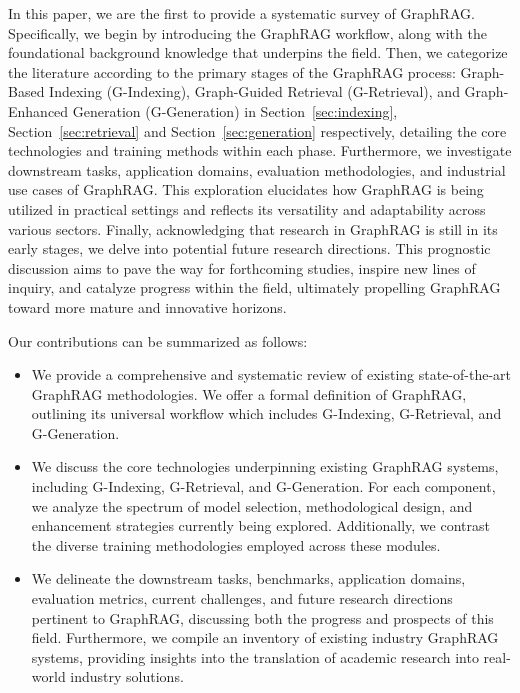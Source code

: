 \documentclass[acmsmall]{acmart}
\begin{document}
In this paper, we are the first to provide a systematic survey of GraphRAG. Specifically, we begin by introducing the GraphRAG workflow, along with the foundational background knowledge that underpins the field. Then, we categorize the literature according to the primary stages of the GraphRAG process: Graph-Based Indexing (G-Indexing), Graph-Guided Retrieval (G-Retrieval), and Graph-Enhanced Generation (G-Generation) in Section~\ref{sec:indexing}, Section~\ref{sec:retrieval} and Section~\ref{sec:generation} respectively, detailing the core technologies and training methods within each phase. 
Furthermore, we investigate downstream tasks, application domains, evaluation methodologies, and industrial use cases of GraphRAG. This exploration elucidates how GraphRAG is being utilized in practical settings and reflects its versatility and adaptability across various sectors. Finally, acknowledging that research in GraphRAG is still in its early stages, we delve into potential future research directions. This prognostic discussion aims to pave the way for forthcoming studies, inspire new lines of inquiry, and catalyze progress within the field, ultimately propelling GraphRAG toward more mature and innovative horizons.

Our contributions can be summarized as follows:

\begin{itemize}
\item We provide a comprehensive and systematic review of existing state-of-the-art GraphRAG methodologies. We offer a formal definition of GraphRAG, outlining its universal workflow which includes G-Indexing, G-Retrieval, and G-Generation. 

\item We discuss the core technologies underpinning existing GraphRAG systems, including G-Indexing, G-Retrieval, and G-Generation. For each component, we analyze the spectrum of model selection, methodological design, and enhancement strategies currently being explored. Additionally, we contrast the diverse training methodologies employed across these modules.

\item We delineate the downstream tasks, benchmarks, application domains, evaluation metrics, current challenges, and future research directions pertinent to GraphRAG, discussing both the progress and prospects of this field. Furthermore, we compile an inventory of existing industry GraphRAG systems, providing insights into the translation of academic research into real-world industry solutions.

\end{itemize}
\end{document}
